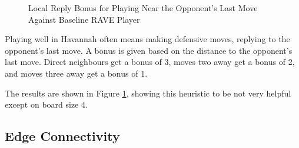 \begin{figure}
	\centering
{}
	\caption[Local Reply Bonus]{Local Reply Bonus for Playing Near the Opponent's Last Move Against Baseline RAVE Player}
	\label{fig:localreply}
\end{figure}

Playing well in Havannah often means making defensive moves, replying to the opponent's last move. A bonus is given based on the distance to the opponent's last move. Direct neighbours get a bonus of 3, moves two away get a bonus of 2, and moves three away get a bonus of 1.

The results are shown in Figure \ref{fig:localreply}, showing this heuristic to be not very helpful except on board size 4.



\subsection{Edge Connectivity}

